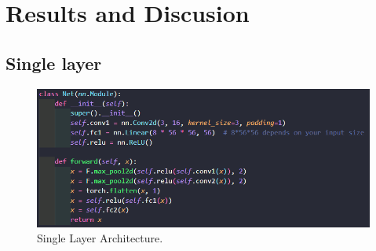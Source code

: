 \documentclass[conference]{IEEEtran}
\begin{document}
\section{Results and Discusion}
\subsection{Single layer}

\begin{figure}[h]
    \centering
    \includegraphics[width=\linewidth]{single layer arc.png}
    \caption{Single Layer Architecture.}
    \label{figSl}
\end{figure}
\end{document}
